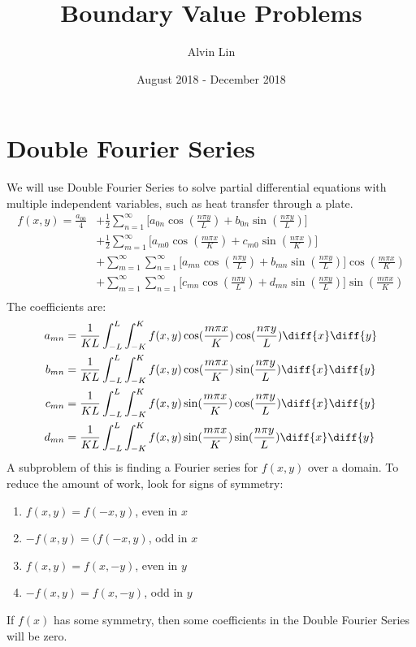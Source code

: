 \documentclass{math}
\title{Boundary Value Problems}
\author{Alvin Lin}
\date{August 2018 - December 2018}
\begin{document}
\maketitle

\section*{Double Fourier Series}
We will use Double Fourier Series to solve partial differential equations with
multiple independent variables, such as heat transfer through a plate.
\begin{align*}
  f(x,y) = \frac{a_{00}}{4}&+\frac{1}{2}\sum_{n=1}^{\infty}
    \bigg[a_{0n}\cos(\frac{n\pi y}{L})+b_{0n}\sin(\frac{n\pi y}{L})\bigg] \\
  &+\frac{1}{2}\sum_{m=1}^{\infty}
    \bigg[a_{m0}\cos(\frac{m\pi x}{K})+c_{m0}\sin(\frac{n\pi x}{K})\bigg] \\
  &+\sum_{m=1}^{\infty}\sum_{n=1}^{\infty}
    \bigg[a_{mn}\cos(\frac{n\pi y}{L})+b_{mn}\sin(\frac{n\pi y}{L})\bigg]
      \cos(\frac{m\pi x}{K}) \\
  &+\sum_{m=1}^{\infty}\sum_{n=1}^{\infty}
    \bigg[c_{mn}\cos(\frac{n\pi y}{L})+d_{mn}\sin(\frac{n\pi y}{L})\bigg]
      \sin(\frac{m\pi x}{K}) \\
\end{align*}
The coefficients are:
\begin{align*}
  a_{mn} &= \frac{1}{KL}\int_{-L}^{L}\int_{-K}^{K}f(x,y)\cos(\frac{m\pi x}{K})
    \cos(\frac{n\pi y}{L})\diff{x}\diff{y} \\
  b_{mn} &= \frac{1}{KL}\int_{-L}^{L}\int_{-K}^{K}f(x,y)\cos(\frac{m\pi x}{K})
    \sin(\frac{n\pi y}{L})\diff{x}\diff{y} \\
  c_{mn} &= \frac{1}{KL}\int_{-L}^{L}\int_{-K}^{K}f(x,y)\sin(\frac{m\pi x}{K})
    \cos(\frac{n\pi y}{L})\diff{x}\diff{y} \\
  d_{mn} &= \frac{1}{KL}\int_{-L}^{L}\int_{-K}^{K}f(x,y)\sin(\frac{m\pi x}{K})
    \sin(\frac{n\pi y}{L})\diff{x}\diff{y} \\
\end{align*}
A subproblem of this is finding a Fourier series for \( f(x,y) \) over a domain.
To reduce the amount of work, look for signs of symmetry:
\begin{enumerate}
  \item \( f(x,y) = f(-x,y) \), even in \( x \)
  \item \( -f(x,y) = (f(-x,y) \), odd in \( x \)
  \item \( f(x,y) = f(x,-y) \), even in \( y \)
  \item \( -f(x,y) = f(x,-y) \), odd in \( y \)
\end{enumerate}
If \( f(x) \) has some symmetry, then some coefficients in the Double Fourier
Series will be zero.
\end{document}

